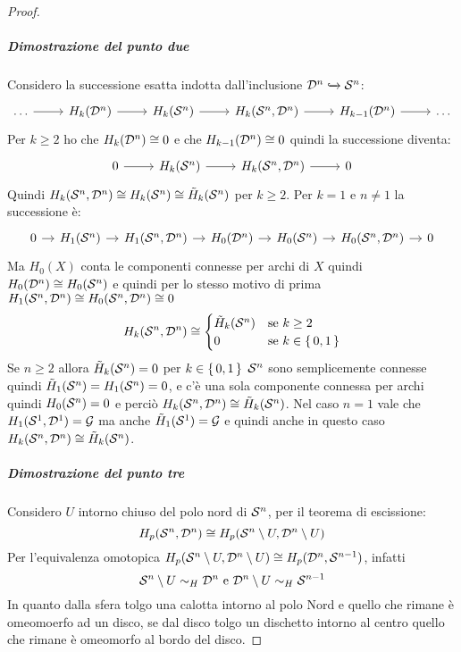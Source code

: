 \begin{proof}
  \subparagraph{Dimostrazione del punto due}

  Considero la successione esatta indotta dall'inclusione $ \mathcal{D}^{n} \xhookrightarrow{} \mathcal{S}^{n} $:
  \[
    \begin{tikzcd}
      \dots \rar & H_k(\Disk{n}) \rar & H_k(\Sph{n}) \rar & H_k(\Sph{n}, \Disk{n}) \rar & H_{k-1}(\Disk{n}) \rar & \dots
    \end{tikzcd}
  \]
  Per $ k \geq 2 $ ho che $ H_k(\mathcal{D}^{n}) \cong 0 $ e che $ H_{k-1}(\mathcal{D}^{n}) \cong 0 $ quindi
  la successione diventa:
  \[
    \begin{tikzcd}
      0 \rar & H_k(\Sph{n}) \rar & H_k(\Sph{n}, \Disk{n}) \rar & 0
    \end{tikzcd}
  \]
  Quindi
  $ H_k(\mathcal{S}^{n}, \mathcal{D}^{n}) \cong H_k(\mathcal{S}^{n}) \cong \tilde{H}_k(\mathcal{S}^{n}) $ per
  $ k \geq 2 $. Per $ k = 1 $ e $ n \not = 1 $ la successione è:
  \[
    \begin{tikzcd}[nodes={column sep=10pt}]
      0 \rar & H_1(\Sph{n}) \rar & H_1(\Sph{n}, \Disk{n}) \rar & H_0(\Disk{n}) \rar & H_0(\Sph{n}) \rar & H_0(\Sph{n}, \Disk{n}) \rar & 0
    \end{tikzcd}
  \]
  Ma $ H_0(X) $ conta le componenti connesse per archi di $ X $ quindi
  $ H_0(\mathcal{D}^{n}) \cong H_0(\mathcal{S}^{n}) $ e quindi per lo stesso motivo di prima
  $ H_1(\mathcal{S}^{n}, \mathcal{D}^{n}) \cong H_0(\mathcal{S}^{n}, \mathcal{D}^{n}) \cong 0 $
  \[
    H_k(\mathcal{S}^{n}, \mathcal{D}^{n}) \cong
    \begin{cases}
      \tilde{H}_k(\mathcal{S}^{n}) & \text{se } k \geq 2 \\
      0 & \text{se } k \in \set{0,1}
    \end{cases}
  \]
  Se $ n \geq 2 $ allora $ \tilde{H}_k(\mathcal{S}^{n}) = 0 $ per $ k \in \set{0,1} $
  $ \mathcal{S}^{n} $ sono semplicemente connesse quindi
  $ \tilde{H}_1(\mathcal{S}^{n}) = H_1(\mathcal{S}^{n}) = 0 $, e c'è una sola componente
  connessa per archi quindi $ H_0(\mathcal{S}^{n}) = 0 $ e perciò
  $ H_k(\mathcal{S}^{n}, \mathcal{D}^{n}) \cong \tilde{H}_k(\mathcal{S}^{n}) $. Nel caso $ n = 1 $ vale che
  $ H_1(\mathcal{S}^{1}, \mathcal{D}^{1}) = \mathcal{G} $ ma anche
  $ \tilde{H}_1(\mathcal{S}^{1}) = \mathcal{G} $ e quindi anche in questo caso
  $ H_k(\mathcal{S}^{n}, \mathcal{D}^{n}) \cong \tilde{H}_k(\mathcal{S}^{n}) $.

  \subparagraph{Dimostrazione del  punto tre}
  Considero $ U $ intorno chiuso del polo nord di $ \mathcal{S}^{n} $,
  per il teorema di escissione:
  \[
    H_p(\mathcal{S}^{n}, \mathcal{D}^{n}) \cong H_p(\mathcal{S}^{n} \setminus U, \mathcal{D}^{n} \setminus U )
  \]
  Per l'equivalenza omotopica
  $ H_p(\mathcal{S}^{n} \setminus U, \mathcal{D}^{n} \setminus U ) \cong H_p(\mathcal{D}^{n}, \mathcal{S}^{n-1}) $, infatti
  \[
    \mathcal{S}^{n} \setminus U \sim_H \mathcal{D}^{n} \text{ e } \mathcal{D}^{n} \setminus U \sim_H \mathcal{S}^{n-1}
  \]
  In quanto dalla sfera tolgo una calotta intorno al polo Nord e quello che rimane
  è omeomoerfo ad un disco, se dal disco tolgo un dischetto intorno al centro
  quello che rimane è omeomorfo al bordo del disco.


\end{proof}
